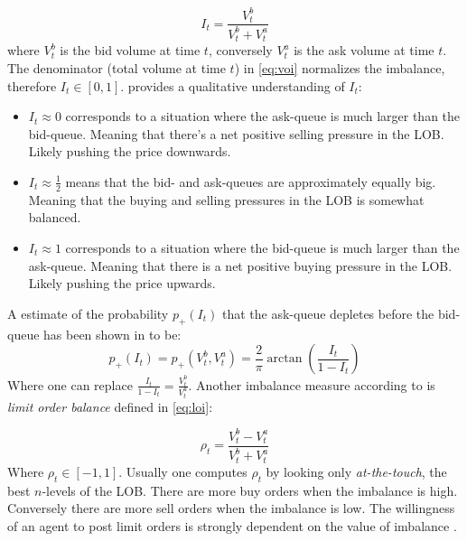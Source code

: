 \documentclass{kththesis}
\theoremstyle{definition}
\begin{document}
\begin{equation}
    I_t = \frac{V_{t}^{b}}{V_{t}^{b}+V_{t}^{a}}
    \label{eq:voi}
\end{equation}
where $V_{t}^{b}$ is the bid volume at time $t$, conversely $V_{t}^{a}$ is the ask volume at time $t$. The denominator (total volume at time $t$) in \autoref{eq:voi} normalizes the imbalance, therefore $I_t \in [0, 1]$. \textcite{bouchaud2018trades} provides a qualitative understanding of $I_t$:
\begin{itemize}
    \item $I_t \approx 0$ corresponds to a situation where the ask-queue is much larger than the bid-queue. Meaning that there's a net positive selling pressure in the LOB. Likely pushing the price downwards.
    \item $I_t \approx \frac{1}{2}$ means that the bid- and ask-queues are approximately equally big. Meaning that the buying and selling pressures in the LOB is somewhat balanced.
    \item $I_t \approx 1$ corresponds to a situation where the bid-queue is much larger than the ask-queue. Meaning that there is a net positive buying pressure in the LOB. Likely pushing the price upwards.
\end{itemize}
A estimate of the probability $p_{+}(I_t)$ that the ask-queue depletes before the bid-queue has been shown in \parencite{bouchaud2018trades} to be:
\begin{equation}
    p_{+}(I_t) = p_{+}(V_{t}^{b}, V_{t}^{a}) = \frac{2}{\pi}\arctan{\left(\frac{I_t}{1-I_t}\right)}
\end{equation}
Where one can replace $\frac{I_t}{1-I_t} = \frac{V_{t}^{b}}{V_{t}^{a}}$. 
Another imbalance measure according to \textcite{cartea2015algorithmic} is \textit{limit order balance} defined in \autoref{eq:loi}:

\begin{equation}
    \rho_{t} = \frac{V_{t}^{b} - V_{t}^{a}}{V_{t}^{b}+V_{t}^{a}}
    \label{eq:loi}
\end{equation}
Where $\rho_t \in [-1,1]$. Usually one computes $\rho_t$ by looking only \textit{at-the-touch}, the best $n$-levels of the LOB. There are more buy orders when the imbalance is high. Conversely there are more sell orders when the imbalance is low. The willingness of an agent to post limit orders is strongly dependent on the value of imbalance \parencite{cartea2015algorithmic}.
\newline
\end{document}

